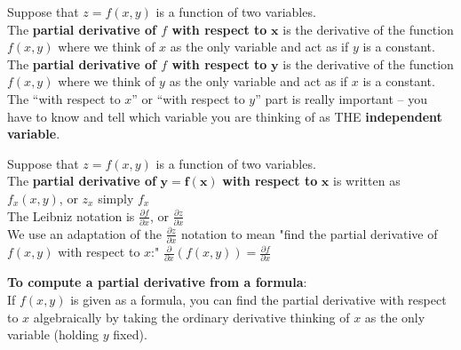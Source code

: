 \begin{tcolorbox}[title = {Partial Derivatives}]
\noindent Suppose that $z = f(x, y)$ is a function of two variables.\\

The \textbf{partial derivative of $f$ with respect to} $\bm{x}$ is the derivative of the function $f(x,y)$ where we think of $x$ as the only variable and act as if $y$ is a constant.\\

The \textbf{partial derivative of $f$ with respect to} $\bm{y}$ is the derivative of the function $f(x,y)$ where we think of $y$ as the only variable and act as if $x$ is a constant.\\

The “with respect to $x$” or “with respect to $y$” part is really important – you have to know and tell which variable you are thinking of as THE \textbf{independent variable}.
\end{tcolorbox}

\begin{tcolorbox}[title = {Notation for the Partial Derivative}]
\noindent Suppose that $z = f(x, y)$ is a function of two variables.\\

\noindent The \textbf{partial derivative of} $\bm{y=f(x)}$ \textbf{with respect to} $\bm{x}$ is written as $f_x (x,y)$, or $z_x$ simply $f_x$\\

\noindent The Leibniz notation is $\displaystyle\frac{\partial f}{\partial x}$, or $\displaystyle\frac{\partial z}{\partial x}$\\

We use an adaptation of the $\displaystyle\frac{\partial z}{\partial x}$ notation to mean "find the partial derivative of $f(x,y)$ with respect to $x$:" $\displaystyle\frac{\partial }{\partial x}(f(x,y))=\frac{\partial f}{\partial x}$\\

\end{tcolorbox}
\noindent \textbf{To compute a partial derivative from a formula}:\\

\noindent If $f(x,y)$ is given as a formula, you can find the partial derivative with respect to $x$ algebraically by taking the ordinary derivative thinking of $x$ as the only variable (holding $y$ fixed).\\

